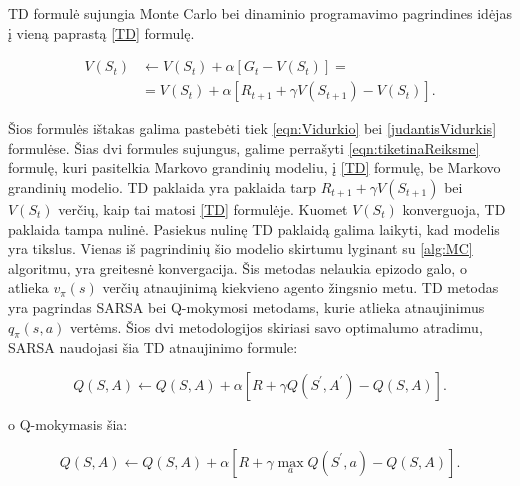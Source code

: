 \documentclass[a4paper, 12pt]{article}
\begin{document}
TD formulė sujungia Monte Carlo bei dinaminio programavimo pagrindines idėjas į vieną paprastą \ref{TD} formulę. 

\begin{equation}
\label{TD}
\begin{aligned}
V\left(S_{t}\right) &\leftarrow V\left(S_{t}\right)+\alpha\left[G_{t}-V\left(S_{t}\right)\right] = \\
& = V\left(S_{t}\right)+\alpha\left[R_{t+1}+\gamma V\left(S_{t+1}\right)-V\left(S_{t}\right)\right].
\end{aligned}
\end{equation}

Šios formulės ištakas galima pastebėti tiek \ref{eqn:Vidurkio} bei \ref{judantisVidurkis} formulėse. Šias dvi formules sujungus, galime perrašyti \ref{eqn:tiketinaReiksme} formulę, kuri pasitelkia Markovo grandinių modeliu, į \ref{TD} formulę, be Markovo grandinių modelio. TD paklaida yra paklaida tarp $R_{t+1}+\gamma V\left(S_{t+1}\right)$ bei $V\left(S_{t}\right)$ verčių, kaip tai matosi \ref{TD} formulėje. Kuomet $V\left(S_{t}\right)$ konverguoja, TD paklaida tampa nulinė. Pasiekus nulinę TD paklaidą galima laikyti, kad modelis yra tikslus. Vienas iš pagrindinių šio modelio skirtumu lyginant su \ref{alg:MC} algoritmu, yra greitesnė konvergacija. Šis metodas nelaukia epizodo galo, o atlieka $v_{\pi}(s)$ verčių atnaujinimą kiekvieno agento žingsnio metu. TD metodas yra pagrindas SARSA bei Q-mokymosi metodams, kurie atlieka atnaujinimus $q_{\pi}(s, a)$ vertėms. Šios dvi metodologijos skiriasi savo optimalumo atradimu, SARSA naudojasi šia TD atnaujinimo formule:

\begin{equation}
Q(S, A) \leftarrow Q(S, A)+\alpha\left[R+\gamma Q\left(S^{\prime}, A^{\prime}\right)-Q(S, A)\right].
\end{equation}

o Q-mokymasis šia:

\begin{equation}
\label{TD-Q}
Q(S, A) \leftarrow Q(S, A)+\alpha\left[R+\gamma \max _{a} Q\left(S^{\prime}, a\right)-Q(S, A)\right].
\end{equation}
\end{document}
